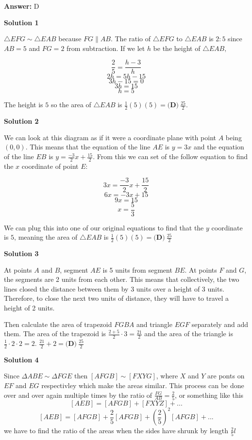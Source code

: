 \begin{enumerate}
 \textbf{Answer: }D



\textbf{Solution 1}

$\triangle EFG \sim \triangle EAB$ because $FG \parallel AB.$ The ratio of $\triangle EFG$ to $\triangle EAB$ is $2:5$ since $AB=5$ and $FG=2$ from subtraction. If we let $h$ be the height of $\triangle EAB,$

 \[\frac{2}{5} = \frac{h-3}{h}\]
 \[2h = 5h-15\]
 \[3h-15 = 0\]
 \[3h = 15\]
 \[h = 5\]

 The height is $5$ so the area of $\triangle EAB$ is $\frac{1}{2}(5)(5) = \boxed{\textbf{(D)}\ \frac{25}{2}}$.

 



\textbf{Solution 2}

We can look at this diagram as if it were a coordinate plane with point $A$ being $(0,0)$. This means that the equation of the line $AE$ is $y=3x$ and the equation of the line $EB$ is $y=\frac{-3}{2}x+\frac{15}{2}$. From this we can set of the follow equation to find the $x$ coordinate of point $E$:

 
 \[3x=\frac{-3}{2}x+\frac{15}{2}\]
 \[6x=-3x+15\]
 \[9x=15\]
 \[x=\frac{5}{3}\]

 We can plug this into one of our original equations to find that the $y$ coordinate is $5$, meaning the area of $\triangle EAB$ is $\frac{1}{2}(5)(5) = \boxed{\textbf{(D)}\ \frac{25}{2}}$




\textbf{Solution 3}

At points $A$ and $B$, segment $AE$ is 5 units from segment $BE$. At points $F$ and $G$, the segments are 2 units from each other. This means that collectively, the two lines closed the distance between them by 3 units over a height of 3 units. Therefore, to close the next two units of distance, they will have to travel a height of 2 units.

 Then calculate the area of trapezoid $FGBA$ and triangle $EGF$ separately and add them. The area of the trapezoid is $\frac {2+5}{2}\cdot 3 = \frac {21}{2}$ and the area of the triangle is $\frac{1}{2}\cdot 2 \cdot 2 = 2$. $\frac{21}{2}+2=\boxed{\textbf{(D)}\ \frac{25}{2}}$




\textbf{Solution 4}

Since $\Delta{ABE}\sim{\Delta{FGE}}$ then $[AFGB]\sim{[FXYG]}$, where $X$ and $Y$ are ponts on $EF$ and $EG$ respectivley which make the areas similar. This process can be done over and over again multiple times by the ratio of $\frac{FG}{AB}=\frac{2}{5}$, or something like this
 \[[AEB]=[AFGB]+[FXYZ]+...\]
 \[[AEB]=[AFGB]+\frac{2}{5}[AFGB]+(\frac{2}{5})^2[AFGB]+...\]we have to find the ratio of the areas when the sides have shrunk by length $\frac{2}{5}l$


\end{enumerate}

